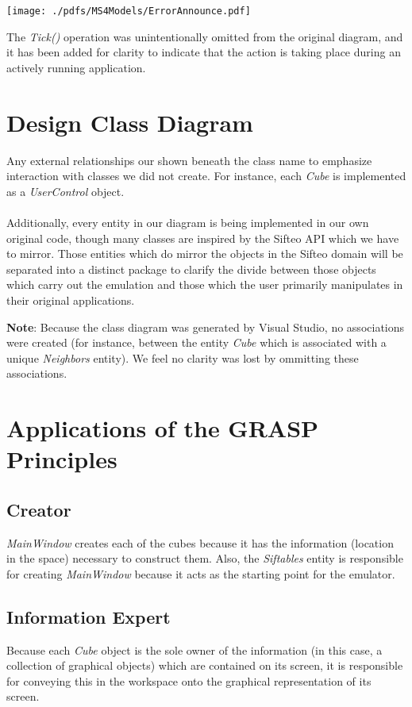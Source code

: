 \documentclass[12pt]{article}
\begin{document}
\begin{center}
        \texttt{[image: ./pdfs/MS4Models/ErrorAnnounce.pdf]}
\end{center}
The \textit{Tick()} operation was unintentionally omitted from the original diagram, and it has been added for clarity to indicate that the action is taking place during an actively running application.

\section{Design Class Diagram}
Any external relationships our shown beneath the class name to emphasize interaction with classes we did not create. For instance, each \textit{Cube} is implemented as a \textit{UserControl} object.
\\\\
Additionally, every entity in our diagram is being implemented in our own original code, though many classes are inspired by the Sifteo API which we have to mirror. Those entities which do mirror the objects in the Sifteo domain will be separated into a distinct package to clarify the divide between those objects which carry out the emulation and those which the user primarily manipulates in their original applications.



\textbf{Note}: Because the class diagram was generated by Visual Studio, no associations were created (for instance, between the entity \textit{Cube} which is associated with a unique \textit{Neighbors} entity). We feel no clarity was lost by ommitting these associations.

\section{Applications of the GRASP Principles}

\subsection{Creator}
\textit{MainWindow} creates each of the cubes because it has the information (location in the space) necessary to construct them. Also, the \textit{Siftables} entity is responsible for creating \textit{MainWindow} because it acts as the starting point for the emulator.

\subsection{Information Expert}
Because each \textit{Cube} object is the sole owner of the information (in this case, a collection of graphical objects) which are contained on its screen, it is responsible for conveying this in the workspace onto the graphical representation of its screen.
\end{document}
